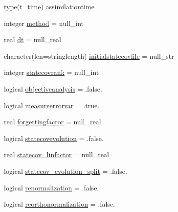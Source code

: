 \begin{DoxyCompactItemize}
\item 
type(t\+\_\+time) \mbox{\hyperlink{structmodulesequentialassimilation_1_1t__sequentialassimilation_a254ebae232ce599996eb3c518af35b84}{assimilationtime}}
\item 
integer \mbox{\hyperlink{structmodulesequentialassimilation_1_1t__sequentialassimilation_add07e441d4a01c73f201da28d6d54277}{method}} = null\+\_\+int
\item 
real \mbox{\hyperlink{structmodulesequentialassimilation_1_1t__sequentialassimilation_afcc30225732605137088115bd243bb57}{dt}} = null\+\_\+real
\item 
character(len=stringlength) \mbox{\hyperlink{structmodulesequentialassimilation_1_1t__sequentialassimilation_ae527f9ec376a28d327b32194bb90f9ca}{initialstatecovfile}} = null\+\_\+str
\item 
integer \mbox{\hyperlink{structmodulesequentialassimilation_1_1t__sequentialassimilation_afd2dfa5cd3d6793faa9eb171e52e70e6}{statecovrank}} = null\+\_\+int
\item 
logical \mbox{\hyperlink{structmodulesequentialassimilation_1_1t__sequentialassimilation_a3dbfdb8b5d6b59cabc7ba7322afab480}{objectiveanalysis}} = .false.
\item 
logical \mbox{\hyperlink{structmodulesequentialassimilation_1_1t__sequentialassimilation_af564751301b96b5a5b6c323fac802250}{measureerrorvar}} = .true.
\item 
real \mbox{\hyperlink{structmodulesequentialassimilation_1_1t__sequentialassimilation_a81ddb73b8f5e3066377ba0cd827d3a2a}{forgettingfactor}} = null\+\_\+real
\item 
logical \mbox{\hyperlink{structmodulesequentialassimilation_1_1t__sequentialassimilation_ac69b6300a23296d11bbbfa78247ee320}{statecovevolution}} = .false.
\item 
real \mbox{\hyperlink{structmodulesequentialassimilation_1_1t__sequentialassimilation_ab34115e149a13305ca422b5185c6027b}{statecov\+\_\+linfactor}} = null\+\_\+real
\item 
logical \mbox{\hyperlink{structmodulesequentialassimilation_1_1t__sequentialassimilation_a2b4c8219c7ec13cb88e8c3e4732931ec}{statecov\+\_\+evolution\+\_\+split}} = .false.
\item 
logical \mbox{\hyperlink{structmodulesequentialassimilation_1_1t__sequentialassimilation_a4ef421bac5fe8139970e6d511e0cadda}{renormalization}} = .false.
\item 
logical \mbox{\hyperlink{structmodulesequentialassimilation_1_1t__sequentialassimilation_ad3a349826dc60eaa1720cbe59ed022fe}{reorthonormalization}} = .false.

\end{DoxyCompactItemize}
